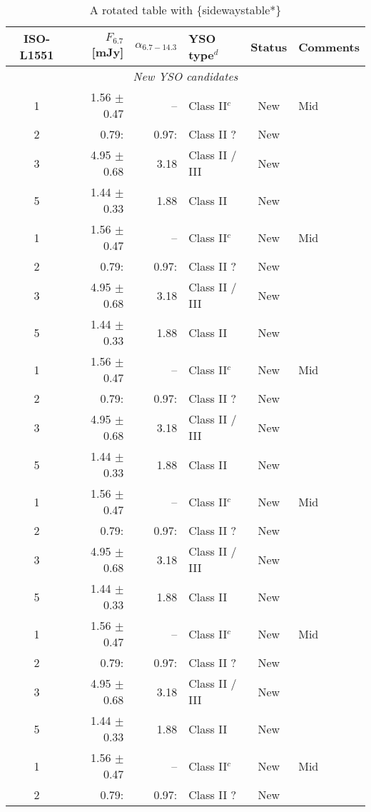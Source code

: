 \documentclass{aa}
\begin{document}
\begin{appendix}
\begin{sidewaystable*}
\caption{A rotated table with \{sidewaystable*\}}
\label{table:4} 
\centering
\begin{tabular}{crrlcl}
\hline        
ISO-L1551 & $F_{6.7}$~[mJy] & $\alpha_{6.7-14.3}$ & YSO type$^{d}$ & Status & Comments \\
\hline
   \multicolumn{6}{c}{\it New YSO candidates}\\ %
\hline
   1 & 1.56 $\pm$ 0.47 & --    & Class II$^{c}$ & New & Mid\\
   2 & 0.79:           & 0.97: & Class II ?     & New & \\
   3 & 4.95 $\pm$ 0.68 & 3.18  & Class II / III & New & \\
   5 & 1.44 $\pm$ 0.33 & 1.88  & Class II       & New & \\
   1 & 1.56 $\pm$ 0.47 & --    & Class II$^{c}$ & New & Mid\\
   2 & 0.79:           & 0.97: & Class II ?     & New & \\
   3 & 4.95 $\pm$ 0.68 & 3.18  & Class II / III & New & \\
   5 & 1.44 $\pm$ 0.33 & 1.88  & Class II       & New & \\
   1 & 1.56 $\pm$ 0.47 & --    & Class II$^{c}$ & New & Mid\\
   2 & 0.79:           & 0.97: & Class II ?     & New & \\
   3 & 4.95 $\pm$ 0.68 & 3.18  & Class II / III & New & \\
   5 & 1.44 $\pm$ 0.33 & 1.88  & Class II       & New & \\
   1 & 1.56 $\pm$ 0.47 & --    & Class II$^{c}$ & New & Mid\\
   2 & 0.79:           & 0.97: & Class II ?     & New & \\
   3 & 4.95 $\pm$ 0.68 & 3.18  & Class II / III & New & \\
   5 & 1.44 $\pm$ 0.33 & 1.88  & Class II       & New & \\
   1 & 1.56 $\pm$ 0.47 & --    & Class II$^{c}$ & New & Mid\\
   2 & 0.79:           & 0.97: & Class II ?     & New & \\
   3 & 4.95 $\pm$ 0.68 & 3.18  & Class II / III & New & \\
   5 & 1.44 $\pm$ 0.33 & 1.88  & Class II       & New & \\
   1 & 1.56 $\pm$ 0.47 & --    & Class II$^{c}$ & New & Mid\\
   2 & 0.79:           & 0.97: & Class II ?     & New & \\

\end{tabular}
\end{sidewaystable*}
\end{appendix}
\end{document}
